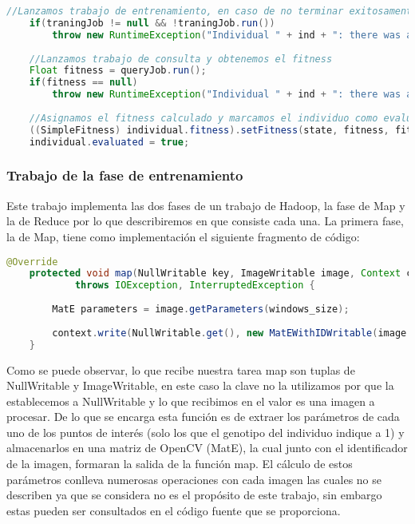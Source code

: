  \begin{lstlisting}[language=Java]
 	//Lanzamos trabajo de entrenamiento, en caso de no terminar exitosamente lanzamos una excepcion
	if(traningJob != null && !traningJob.run())
		throw new RuntimeException("Individual " + ind + ": there was a problem during the training phase");
		
	//Lanzamos trabajo de consulta y obtenemos el fitness
	Float fitness = queryJob.run();
	if(fitness == null)
		throw new RuntimeException("Individual " + ind + ": there was a problem during the query phase");
			
	//Asignamos el fitness calculado y marcamos el individuo como evaluado
	((SimpleFitness) individual.fitness).setFitness(state, fitness, fitness >= 1F);
	individual.evaluated = true;	
\end{lstlisting}

\subsubsection{Trabajo de la fase de entrenamiento}

Este trabajo implementa las dos fases de un trabajo de Hadoop, la fase de Map y la de Reduce por lo que describiremos en que consiste cada una. La primera fase, la de Map, tiene como implementación el siguiente fragmento de c\'odigo:

 \begin{lstlisting}[language=Java]
	@Override
	protected void map(NullWritable key, ImageWritable image, Context context)
			throws IOException, InterruptedException {
		
		MatE parameters = image.getParameters(windows_size);
		
		context.write(NullWritable.get(), new MatEWithIDWritable(image.getId(), parameters));
	}
\end{lstlisting}

Como se puede observar, lo que recibe nuestra tarea map son tuplas de NullWritable y ImageWritable, en este caso la clave no la utilizamos por que la establecemos a NullWritable y lo que recibimos en el valor es una imagen a procesar. De lo que se encarga esta función es de extraer los parámetros de cada uno de los puntos de interés (solo los que el genotipo del individuo indique a 1) y almacenarlos en una matriz de OpenCV (MatE), la cual junto con el identificador de la imagen, formaran la salida de la función map. El c\'alculo de estos parámetros conlleva numerosas operaciones con cada imagen las cuales no se describen ya que se considera no es el propósito de este trabajo, sin embargo estas pueden ser consultados en el código fuente que se proporciona.

